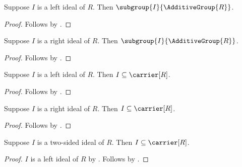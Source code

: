 \begin{corollary}\label{left_ideal_additive_subgroup}
    Suppose $I$ is a left ideal of $R$.
    Then $\subgroup{I}{\AdditiveGroup{R}}$.
\end{corollary}
\begin{proof}
    Follows by .
\end{proof}

\begin{corollary}\label{right_ideal_additive_subgroup}
    Suppose $I$ is a right ideal of $R$.
    Then $\subgroup{I}{\AdditiveGroup{R}}$.
\end{corollary}
\begin{proof}
    Follows by .
\end{proof}

\begin{corollary}\label{left_ideal_subseteq_carrier}
    Suppose $I$ is a left ideal of $R$.
    Then $I\subseteq\carrier[R]$.
\end{corollary}
\begin{proof}
    Follows by
        .
\end{proof}

\begin{corollary}\label{right_ideal_subseteq_carrier}
    Suppose $I$ is a right ideal of $R$.
    Then $I\subseteq\carrier[R]$.
\end{corollary}
\begin{proof}
    Follows by
        .
\end{proof}

\begin{corollary}\label{two_sided_ideal_subseteq_carrier}
    Suppose $I$ is a two-sided ideal of $R$.
    Then $I\subseteq\carrier[R]$.
\end{corollary}
\begin{proof}
    $I$ is a left ideal of $R$ by .
    Follows by .
\end{proof}

